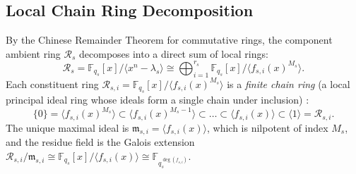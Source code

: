 \documentclass[preprint,12pt]{elsarticle}
\numberwithin{equation}{section}
\theoremstyle{plain}
\theoremstyle{definition}
\theoremstyle{remark}
\begin{document}
\subsection{Local Chain Ring Decomposition}
By the Chinese Remainder Theorem for commutative rings, the component ambient ring $\mathcal{R}_s$ decomposes into a direct sum of local rings:
\begin{equation}
    \mathcal{R}_s = \mathbb{F}_{q_s}[x]/\langle x^n - \lambda_s\rangle \cong \bigoplus_{i=1}^{r_s} \mathbb{F}_{q_s}[x]/\langle f_{s, i}(x)^{M_s}\rangle.
\end{equation}
Each constituent ring $\mathcal{R}_{s, i} = \mathbb{F}_{q_s}[x]/\langle f_{s, i}(x)^{M_s}\rangle$ is a \emph{finite chain ring} (a local principal ideal ring whose ideals form a single chain under inclusion) \cite{Dinh2004,Jitman2013}:
\begin{equation}
    \{0\} = \langle f_{s, i}(x)^{M_s}\rangle \subset \langle f_{s, i}(x)^{M_s-1}\rangle \subset \dots \subset \langle f_{s, i}(x)\rangle \subset \langle 1\rangle = \mathcal{R}_{s, i}.
\end{equation}
The unique maximal ideal is $\mathfrak{m}_{s, i} = \langle f_{s, i}(x)\rangle$, which is nilpotent of index $M_s$, and the residue field is the Galois extension $\mathcal{R}_{s, i}/\mathfrak{m}_{s, i} \cong \mathbb{F}_{q_s}[x]/\langle f_{s, i}(x)\rangle \cong \mathbb{F}_{q_s^{\deg(f_{s, i})}}$.
\end{document}
